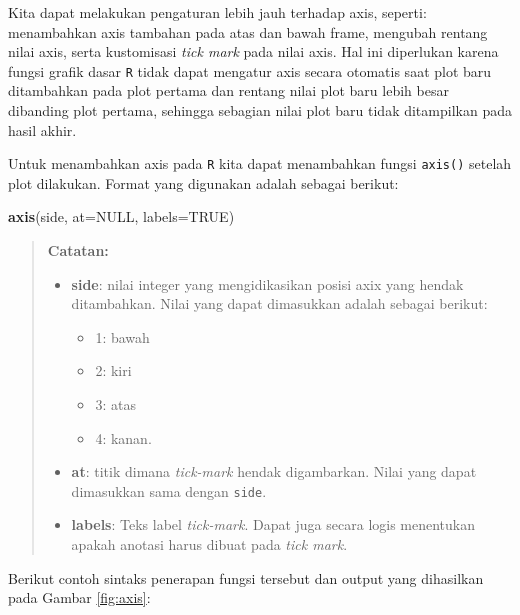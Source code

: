 \documentclass[]{book}
\newenvironment{Shaded}{\begin{snugshade}}{\end{snugshade}}
\newcommand{\DataTypeTok}[1]{\textcolor[rgb]{0.13,0.29,0.53}{#1}}
\newcommand{\KeywordTok}[1]{\textcolor[rgb]{0.13,0.29,0.53}{\textbf{#1}}}
\newcommand{\NormalTok}[1]{#1}
\newcommand{\OtherTok}[1]{\textcolor[rgb]{0.56,0.35,0.01}{#1}}
\providecommand{\tightlist}{%
  \setlength{\itemsep}{0pt}\setlength{\parskip}{0pt}}
\theoremstyle{definition}
\theoremstyle{definition}
\theoremstyle{definition}
\theoremstyle{remark}
\begin{document}
Kita dapat melakukan pengaturan lebih jauh terhadap axis, seperti: menambahkan axis tambahan pada atas dan bawah frame, mengubah rentang nilai axis, serta kustomisasi \emph{tick mark} pada nilai axis. Hal ini diperlukan karena fungsi grafik dasar \texttt{R} tidak dapat mengatur axis secara otomatis saat plot baru ditambahkan pada plot pertama dan rentang nilai plot baru lebih besar dibanding plot pertama, sehingga sebagian nilai plot baru tidak ditampilkan pada hasil akhir.

Untuk menambahkan axis pada \texttt{R} kita dapat menambahkan fungsi \texttt{axis()} setelah plot dilakukan. Format yang digunakan adalah sebagai berikut:

\begin{Shaded}
\begin{Highlighting}[]
\KeywordTok{axis}\NormalTok{(side, }\DataTypeTok{at=}\OtherTok{NULL}\NormalTok{, }\DataTypeTok{labels=}\OtherTok{TRUE}\NormalTok{)}
\end{Highlighting}
\end{Shaded}

\begin{quote}
\textbf{Catatan:}

\begin{itemize}
\tightlist
\item
  \textbf{side}: nilai integer yang mengidikasikan posisi axix yang hendak ditambahkan. Nilai yang dapat dimasukkan adalah sebagai berikut:

  \begin{itemize}
  \tightlist
  \item
    1: bawah
  \item
    2: kiri
  \item
    3: atas
  \item
    4: kanan.
  \end{itemize}
\item
  \textbf{at}: titik dimana \emph{tick-mark} hendak digambarkan. Nilai yang dapat dimasukkan sama dengan \texttt{side}.
\item
  \textbf{labels}: Teks label \emph{tick-mark}. Dapat juga secara logis menentukan apakah anotasi harus dibuat pada \emph{tick mark}.
\end{itemize}
\end{quote}

Berikut contoh sintaks penerapan fungsi tersebut dan output yang dihasilkan pada Gambar \ref{fig:axis}:
\end{document}
